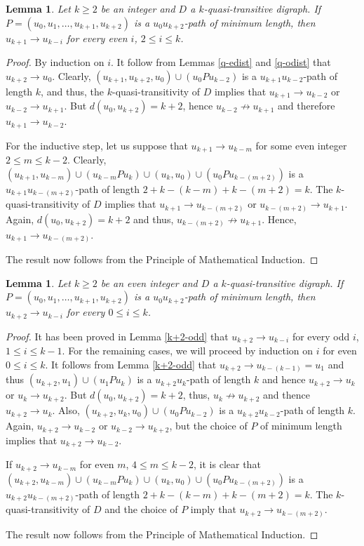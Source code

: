 \documentclass[preprint]{elsarticle}
\newtheorem{lem}[thm]{Lemma}
\begin{document}
\begin{lem} \label{k+1-even}
Let $k \ge 2$ be an integer and $D$ a $k$-quasi-transitive digraph.   If $P = (u_0, u_1, \dots, u_{k+1}, u_{k+2})$ is a $u_0 u_{k+2}$-path of minimum length, then $u_{k+1} \to u_{k-i}$ for every even $i$, $2 \le i \le k$.
\end{lem}

\begin{proof}
By induction on $i$.   It follow from Lemmas \ref{q-edist} and \ref{q-odist} that $u_{k+2} \to u_0$.   Clearly, $(u_{k+1}, u_{k+2}, u_0) \cup (u_0 P u_{k-2})$ is a $u_{k+1} u_{k-2}$-path of length $k$, and thus, the $k$-quasi-transitivity of $D$ implies that $u_{k+1} \to u_{k-2}$ or $u_{k-2} \to u_{k+1}$.   But $d (u_0, u_{k+2}) = k+2$, hence $u_{k-2} \not \to u_{k+1}$ and therefore $u_{k+1} \to u_{k-2}$.

For the inductive step, let us suppose that $u_{k+1} \to u_{k-m}$ for some even integer $2 \le m \le k-2$.  Clearly, $(u_{k+1}, u_{k-m}) \cup (u_{k-m} P u_k) \cup (u_k, u_0) \cup (u_0 P u_{k-(m+2)})$ is a $u_{k+1} u_{k-(m+2)}$-path of length $2 + k-(k-m) + k-(m+2) = k$.   The $k$-quasi-transitivity of $D$ implies that $u_{k+1} \to u_{k-(m+2)}$ or $u_{k-(m+2)} \to u_{k+1}$.   Again, $d(u_0, u_{k+2}) = k+2$ and thus, $u_{k-(m+2)} \not \to u_{k+1}$.   Hence, $u_{k+1} \to u_{k-(m+2)}$.

The result now follows from the Principle of Mathematical Induction.
\end{proof}

\begin{lem} \label{k+2-even}
Let $k \ge 2$ be an even integer and $D$ a $k$-quasi-transitive digraph.   If $P = (u_0, u_1, \dots, u_{k+1}, u_{k+2})$ is a $u_0 u_{k+2}$-path of minimum length, then $u_{k+2} \to u_{k-i}$ for every $0 \le i \le k$.
\end{lem}

\begin{proof}
It has been proved in Lemma \ref{k+2-odd} that $u_{k+2} \to u_{k-i}$ for every odd $i$, $1 \le i \le k-1$.   For the remaining cases, we will proceed by induction on $i$ for even $0 \le i \le k$.    It follows from Lemma \ref{k+2-odd} that $u_{k+2} \to u_{k-(k-1)} = u_1$ and thus $(u_{k+2}, u_1) \cup (u_1 P u_k)$ is a $u_{k+2} u_k$-path of length $k$ and hence $u_{k+2} \to u_k$ or $u_k \to u_{k+2}$.   But $d(u_0, u_{k+2}) = k+2$, thus, $u_k \not \to u_{k+2}$ and thence $u_{k+2} \to u_k$.   Also, $(u_{k+2}, u_k, u_0) \cup (u_0 P u_{k-2})$ is a $u_{k+2} u_{k-2}$-path of length $k$.   Again, $u_{k+2} \to u_{k-2}$ or $u_{k-2} \to u_{k+2}$, but the choice of $P$ of minimum length implies that $u_{k+2} \to u_{k-2}$.

If $u_{k+2} \to u_{k-m}$ for even $m$, $4 \le m \le k-2$, it is clear that $(u_{k+2}, u_{k-m}) \cup (u_{k-m} P u_k) \cup (u_k, u_0) \cup (u_0 P u_{k-(m+2)})$ is a $u_{k+2} u_{k-(m+2)}$-path of length $2 + k-(k-m) + k-(m+2) = k$.   The $k$-quasi-transitivity of $D$ and the choice of $P$ imply that $u_{k+2} \to u_{k-(m+2)}$.

The result now follows from the Principle of Mathematical Induction. 
\end{proof}
\end{document}

